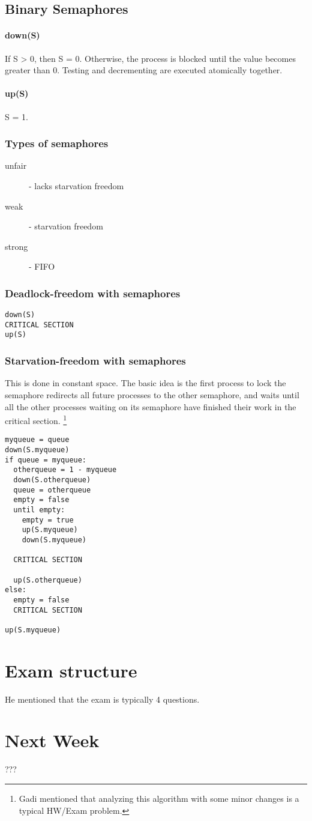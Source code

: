 \documentclass{idc_msc}
\begin{document}
\clearpage
\subsection{Binary Semaphores}

\paragraph{down(S)}
If S > 0, then S = 0.
Otherwise, the process is blocked until the value becomes greater than 0.
Testing and decrementing are executed atomically together.

\paragraph{up(S)}
S = 1.

\subsubsection{Types of semaphores}

\begin{description}
  \item[unfair] - lacks starvation freedom
  \item[weak] - starvation freedom
  \item[strong] - FIFO
\end{description}

\subsubsection{Deadlock-freedom with semaphores}

\begin{lstlisting}[frame=L,mathescape=true,title={For processes $i=1...n$}]
down(S)
CRITICAL SECTION
up(S)
\end{lstlisting}

\subsubsection{Starvation-freedom with semaphores}
This is done in constant space.
The basic idea is the first process to lock the semaphore redirects all future processes to the other semaphore, and waits until all the other processes waiting on its semaphore have finished their work in the critical section.
\footnote{Gadi mentioned that analyzing this algorithm with some minor changes is a typical HW/Exam problem.}

\begin{lstlisting}[frame=L,mathescape=true,title={For processes $i=1...n$}]
myqueue = queue
down(S.myqueue)
if queue = myqueue:
  otherqueue = 1 - myqueue
  down(S.otherqueue)
  queue = otherqueue
  empty = false
  until empty:
    empty = true
    up(S.myqueue)
    down(S.myqueue)

  CRITICAL SECTION

  up(S.otherqueue)
else:
  empty = false
  CRITICAL SECTION

up(S.myqueue)
\end{lstlisting}

\section{Exam structure}
He mentioned that the exam is typically 4 questions.

\section{Next Week}
???
\end{document}
